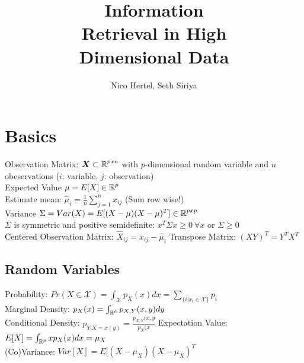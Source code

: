 \documentclass[english]{latex4ei/latex4ei_sheet}
\title{Information \\Retrieval in High\\ Dimensional Data}
\author{Nico Hertel, Seth Siriya}					%
\begin{document}
\maketitle	%

\section{Basics}
\begin{sectionbox}
Observation Matrix: $\boldsymbol{X} \subset \operatorname{\mathbb R}^{pxn}$ with $p$-dimensional random variable and $n$ obeservations ($i$: variable, $j$: observation)\\
Expected Value $\mu=E[X]\in\operatorname{\mathbb R}^p$ \\
Estimate mean: $\hat{\mu}_i=\frac{1}{n}\sum_{j=1}^nx_{ij}$ (Sum row wise!)\\
Variance $\Sigma=Var(X)=E[(X-\mu)(X-\mu)^T]\in\operatorname{\mathbb R}^{pxp}$\\
$\Sigma$ is symmetric and positive semidefinite: $x^T\Sigma x \ge 0\ \forall x$ or $\Sigma \ge 0$\\
Centered Observation Matrix: $\hat{X}_{ij}=x_{ij}-\hat{\mu}_i$
Transpose Matrix: $(XY)^T=Y^TX^T$\\
\subsection{Random Variables}
Probability: $Pr(X\in\mathcal{X})=\int_\mathcal{X}p_X(x)dx=\sum_{\{i|x_i\in\mathcal{X}\}}p_i$\\
Marginal Density: $p_X(x)=\int_{\operatorname{\mathbb R}^k}p_{X,Y}(x,y)dy$\\
Conditional Density: $p_{Y|X=x(y)}=\frac{p_{X,Y}(x,y}{p_X(x}$
Expectation Value: $E[X]=\int_{\operatorname{\mathbb R}^p}xp_X(x)dx=\mu_X$\\
(Co)Variance: $Var[X]=E[(X-\mu_X)(X-\mu_X)^T$
\end{sectionbox}
\end{document}
